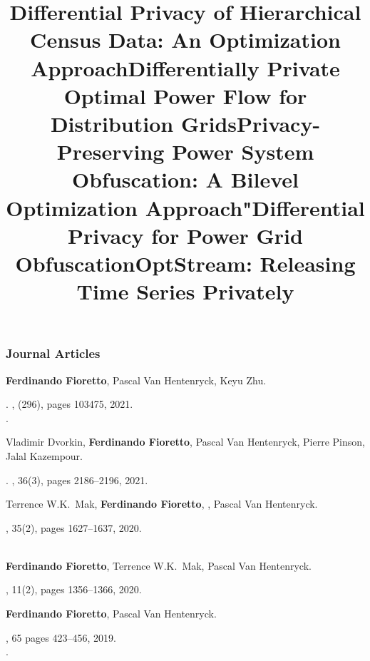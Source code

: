 

\subsubsection*{\sc Journal Articles}
\renewcommand{\labelenumi}{j\theenumi.} 
\beginEnum
	\item 
	{\bf Ferdinando Fioretto}, Pascal Van Hentenryck, Keyu Zhu.
	\title{Differential Privacy of Hierarchical Census Data: An Optimization Approach}. 
	\AIJ, (296), pages 103475, 2021.\\
		.

\item 
	Vladimir Dvorkin, {\bf Ferdinando Fioretto}, Pascal Van Hentenryck, Pierre Pinson, Jalal Kazempour.
	\title{Differentially Private Optimal Power Flow for Distribution Grids}.
	\TPS, 36(3), pages 2186--2196, 2021.

\item \label{jTPSaward}
	Terrence W.K.~Mak, {\bf Ferdinando Fioretto}, , Pascal Van Hentenryck.
	\title{Privacy-Preserving Power System Obfuscation: A Bilevel Optimization Approach"}
	\TPS, 35(2), pages 1627--1637, 2020.\\
	\\


\item 
	{\bf Ferdinando Fioretto}, Terrence W.K.~Mak, Pascal Van Hentenryck.
	\title{Differential Privacy for Power Grid Obfuscation}
	\TSG, 11(2), pages 1356--1366, 2020.

\item 
	{\bf Ferdinando Fioretto}, Pascal Van Hentenryck.
	\title{OptStream: Releasing Time Series Privately}
	\JAIR, 65 pages 423--456, 2019.\\
	.


